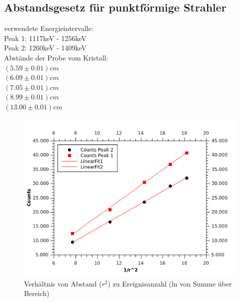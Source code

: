 \documentclass[12pt,a4paper]{article}
\begin{document}
\begin{multicols}{2}
\subsection{Abstandsgesetz für punktförmige Strahler}
verwendete Energieintervalle:\\
Peak 1: 1117keV - 1256keV\\
Peak 2: 1260keV - 1409keV\\

\noindent Abstände der Probe vom Kristall:\\ 
$(5.59 \pm 0.01)cm$\\
$(6.09 \pm 0.01)cm$\\ 
$(7.05 \pm 0.01)cm$\\
$(8.99 \pm 0.01)cm$\\
$(13.00 \pm 0.01)cm$\\
\begin{figure}[H]
	\centering
	\includegraphics[scale=1.3]{./figures/Endergebniss_Abstand_mitFits.png}
	\caption{Verhältnis von Abstand ($r^2$) zu Ereignisanzahl (ln von Summe über Bereich)}
	\label{fig:abstandsgesetz_erg}
\end{figure}


\end{multicols}
\end{document}
